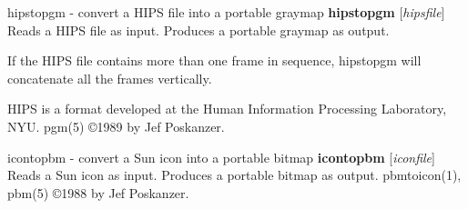 \newpage
%

hipstopgm - convert a HIPS file into a portable graymap
{\bf hipstopgm}
{\rm [}{\it hipsfile}{\rm ]}
Reads a HIPS file as input.
Produces a portable graymap as output.
\par
If the HIPS file contains more than one frame in sequence, hipstopgm
will concatenate all the frames vertically.
\par
HIPS is a format developed at the Human Information Processing
Laboratory, NYU.
pgm(5)
\copyright 1989 by Jef Poskanzer.
%
 
%

\newpage
%

icontopbm - convert a Sun icon into a portable bitmap
{\bf icontopbm}
{\rm [}{\it iconfile}{\rm ]}
Reads a Sun icon as input.
Produces a portable bitmap as output.
pbmtoicon(1), pbm(5)
\copyright 1988 by Jef Poskanzer.
%
 
